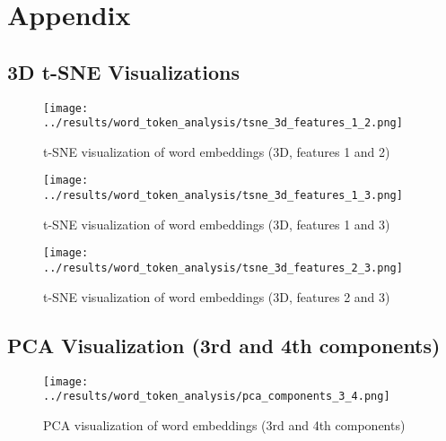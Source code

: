 \documentclass{scrartcl}
\begin{document}
\section{Appendix}
\subsection{3D t-SNE Visualizations}
\begin{figure}[H]
    \centering
    \texttt{[image: ../results/word\_token\_analysis/tsne\_3d\_features\_1\_2.png]}
    \caption{t-SNE visualization of word embeddings (3D, features 1 and 2)}
\end{figure}

\begin{figure}[H]
    \centering
    \texttt{[image: ../results/word\_token\_analysis/tsne\_3d\_features\_1\_3.png]}
    \caption{t-SNE visualization of word embeddings (3D, features 1 and 3)}
\end{figure}

\begin{figure}[H]
    \centering
    \texttt{[image: ../results/word\_token\_analysis/tsne\_3d\_features\_2\_3.png]}
    \caption{t-SNE visualization of word embeddings (3D, features 2 and 3)}
\end{figure}

\subsection{PCA Visualization (3rd and 4th components)}
\begin{figure}[H]
    \centering
    \texttt{[image: ../results/word\_token\_analysis/pca\_components\_3\_4.png]}
    \caption{PCA visualization of word embeddings (3rd and 4th components)}
\end{figure}
\end{document}

